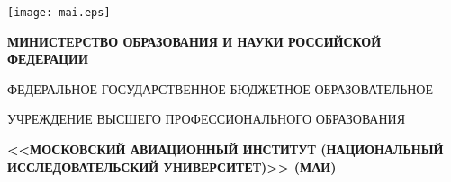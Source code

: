 \begin{center}
\texttt{[image: mai.eps]}

\begin{singlespace}
\footnotesize{

\textbf{МИНИСТЕРСТВО ОБРАЗОВАНИЯ И НАУКИ РОССИЙСКОЙ ФЕДЕРАЦИИ}

ФЕДЕРАЛЬНОЕ ГОСУДАРСТВЕННОЕ БЮДЖЕТНОЕ ОБРАЗОВАТЕЛЬНОЕ

УЧРЕЖДЕНИЕ ВЫСШЕГО ПРОФЕССИОНАЛЬНОГО ОБРАЗОВАНИЯ

\textbf{<<МОСКОВСКИЙ АВИАЦИОННЫЙ ИНСТИТУТ\lb
(НАЦИОНАЛЬНЫЙ ИССЛЕДОВАТЕЛЬСКИЙ УНИВЕРСИТЕТ)>> (МАИ)}
}
\end{singlespace}
\end{center}
